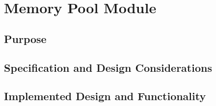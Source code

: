 \section{Memory Pool Module}
\subsection{Purpose}
\subsection{Specification and Design Considerations}
\subsection{Implemented Design and Functionality}